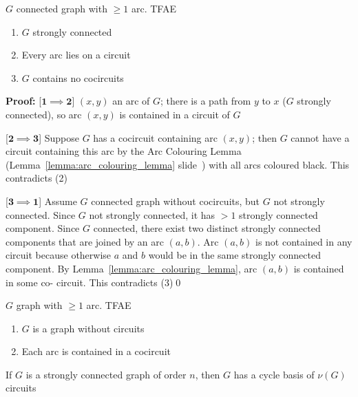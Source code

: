 \documentclass[aspectratio=43]{beamer}
\begin{document}
\begin{frame}
\begin{theorem}
$G$ connected graph with $\geq 1$ arc. TFAE
\begin{enumerate}
\item $G$ strongly connected
\item Every arc lies on a circuit
\item $G$ contains no cocircuits
\end{enumerate}
\end{theorem}
\vfill
\textbf{Proof:}
[$\mathbf{1\implies 2}$]
$(x,y)$ an arc of $G$; there is a path from $y$ to $x$ ($G$ strongly connected), so arc $(x,y)$ is contained in a circuit of $G$

[$\mathbf{2\implies 3}$]
Suppose $G$ has a cocircuit containing arc $(x,y)$; then $G$ cannot have
a circuit containing this arc by the Arc Colouring Lemma (Lemma~\ref{lemma:arc_colouring_lemma} slide~\pageref{lemma:arc_colouring_lemma}) with
all arcs coloured black. This contradicts (2)

[$\mathbf{3\implies 1}$]
Assume $G$ connected graph without cocircuits, but $G$ not strongly connected.
Since $G$ not strongly connected, it has $>1$ strongly
connected component. 
Since $G$ connected, there exist two distinct strongly connected components that are joined by an arc $(a,b)$. Arc $(a,b)$ is not contained in any circuit because otherwise $a$ and $b$ would be in the same strongly connected component. 
By Lemma~\ref{lemma:arc_colouring_lemma}, arc $(a,b)$ is contained in some co-
circuit. This contradicts (3)\qed
\end{frame}


\begin{frame}
\begin{theorem}
$G$ graph with $\geq 1$ arc. TFAE
\begin{enumerate}
\item $G$ is a graph without circuits
\item Each arc is contained in a cocircuit
\end{enumerate}
\end{theorem}
\vfill
\begin{theorem}
If $G$ is a strongly connected graph of order $n$, then $G$ has a cycle basis of $\nu(G)$ circuits
\end{theorem}
\end{frame}
\end{document}
